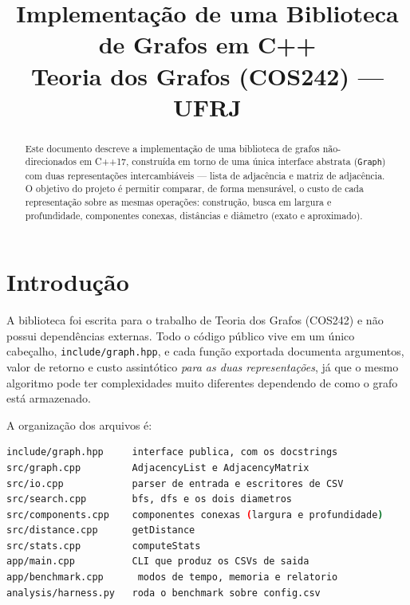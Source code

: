 \documentclass[a4paper,11pt]{article}
\title{Implementação de uma Biblioteca de Grafos em C++\\
\large Teoria dos Grafos (COS242) --- UFRJ}
\author{}
\date{}
\begin{document}
\maketitle

\begin{abstract}
Este documento descreve a implementação de uma biblioteca de grafos
não-direcionados em C++17, construída em torno de uma única interface
abstrata (\texttt{Graph}) com duas representações intercambiáveis ---
lista de adjacência e matriz de adjacência. O objetivo do projeto é
permitir comparar, de forma mensurável, o custo de cada representação
sobre as mesmas operações: construção, busca em largura e profundidade,
componentes conexas, distâncias e diâmetro (exato e aproximado).
\end{abstract}

\tableofcontents

\section{Introdução}

A biblioteca foi escrita para o trabalho de Teoria dos Grafos (COS242) e
não possui dependências externas. Todo o código público vive em um único
cabeçalho, \texttt{include/graph.hpp}, e cada função exportada documenta
argumentos, valor de retorno e custo assintótico \emph{para as duas
representações}, já que o mesmo algoritmo pode ter complexidades muito
diferentes dependendo de como o grafo está armazenado.

A organização dos arquivos é:

\begin{lstlisting}[language=bash,numbers=none]
include/graph.hpp     interface publica, com os docstrings
src/graph.cpp         AdjacencyList e AdjacencyMatrix
src/io.cpp            parser de entrada e escritores de CSV
src/search.cpp        bfs, dfs e os dois diametros
src/components.cpp    componentes conexas (largura e profundidade)
src/distance.cpp      getDistance
src/stats.cpp         computeStats
app/main.cpp          CLI que produz os CSVs de saida
app/benchmark.cpp      modos de tempo, memoria e relatorio
analysis/harness.py   roda o benchmark sobre config.csv
\end{lstlisting}

\end{document}
